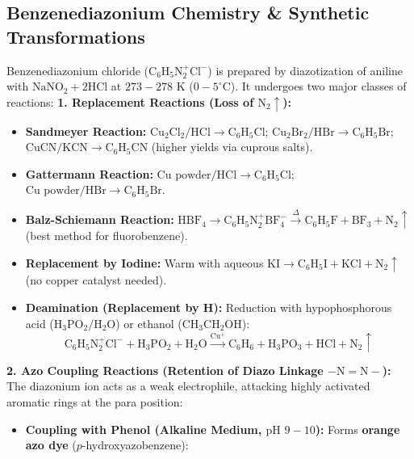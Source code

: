\documentclass[10pt,a4paper]{article}
\begin{document}
\subsection{Benzenediazonium Chemistry \& Synthetic Transformations}

\begin{formulabox}
Benzenediazonium chloride ($\mathrm{C_6H_5N_2^+Cl^-}$) is prepared by diazotization of aniline with $\mathrm{NaNO_2 + 2HCl}$ at $273-278\text{ K}$ ($0-5^\circ\text{C}$). It undergoes two major classes of reactions:
\textbf{1. Replacement Reactions (Loss of $\mathrm{N_2}\uparrow$):}
\begin{itemize}
  \item \textbf{Sandmeyer Reaction:} $\mathrm{Cu_2Cl_2/HCl} \to \mathrm{C_6H_5Cl}$; $\mathrm{Cu_2Br_2/HBr} \to \mathrm{C_6H_5Br}$; $\mathrm{CuCN/KCN} \to \mathrm{C_6H_5CN}$ (higher yields via cuprous salts).
  \item \textbf{Gattermann Reaction:} $\mathrm{Cu \text{ powder} / HCl} \to \mathrm{C_6H_5Cl}$; $\mathrm{Cu \text{ powder} / HBr} \to \mathrm{C_6H_5Br}$.
  \item \textbf{Balz-Schiemann Reaction:} $\mathrm{HBF_4} \to \mathrm{C_6H_5N_2^+BF_4^-} \xrightarrow{\Delta} \mathbf{\mathrm{C_6H_5F}} + \mathrm{BF_3} + \mathrm{N_2}\uparrow$ (best method for fluorobenzene).
  \item \textbf{Replacement by Iodine:} Warm with aqueous $\mathrm{KI} \to \mathbf{\mathrm{C_6H_5I}} + \mathrm{KCl} + \mathrm{N_2}\uparrow$ (no copper catalyst needed).
  \item \textbf{Deamination (Replacement by H):} Reduction with hypophosphorous acid ($\mathrm{H_3PO_2 / H_2O}$) or ethanol ($\mathrm{CH_3CH_2OH}$):
  \begin{equation}
    \mathrm{C_6H_5N_2^+Cl^-} + \mathrm{H_3PO_2} + \mathrm{H_2O} \xrightarrow{\mathrm{Cu^+}} \mathbf{\mathrm{C_6H_6}} + \mathrm{H_3PO_3} + \mathrm{HCl} + \mathrm{N_2}\uparrow
  \end{equation}
\end{itemize}
\textbf{2. Azo Coupling Reactions (Retention of Diazo Linkage $-\mathrm{N=N}-$):}
The diazonium ion acts as a weak electrophile, attacking highly activated aromatic rings at the para position:
\begin{itemize}
  \item \textbf{Coupling with Phenol (Alkaline Medium, $\text{pH } 9-10$):} Forms \textbf{orange azo dye} ($p$-hydroxyazobenzene):
  \begin{equation}

\end{equation}
\end{itemize}
\end{formulabox}
\end{document}
